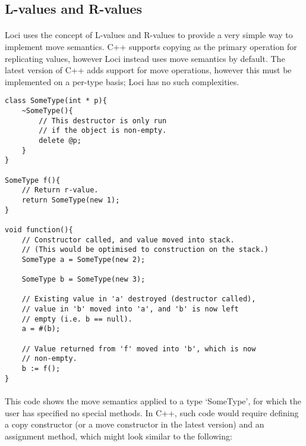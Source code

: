 \documentclass[12pt,twoside,notitlepage]{report}
\begin{document}
\subsection{L-values and R-values}

\paragraph{}
Loci uses the concept of L-values and R-values to provide a very simple way to implement move semantics. C++ supports copying as the primary operation for replicating values, however Loci instead uses move semantics by default. The latest version of C++ adds support for move operations, however this must be implemented on a per-type basis; Loci has no such complexities.

\small{
\begin{verbatim}
class SomeType(int * p){
    ~SomeType(){
        // This destructor is only run
        // if the object is non-empty.
        delete @p;
    }
}

SomeType f(){
    // Return r-value.
    return SomeType(new 1);
}

void function(){
    // Constructor called, and value moved into stack.
    // (This would be optimised to construction on the stack.)
    SomeType a = SomeType(new 2);
    
    SomeType b = SomeType(new 3);
    
    // Existing value in 'a' destroyed (destructor called),
    // value in 'b' moved into 'a', and 'b' is now left
    // empty (i.e. b == null).
    a = #(b);
    
    // Value returned from 'f' moved into 'b', which is now
    // non-empty.
    b := f();
}
\end{verbatim}
}

\paragraph{}
This code shows the move semantics applied to a type `SomeType', for which the user has specified no special methods. In C++, such code would require defining a copy constructor (or a move constructor in the latest version) and an assignment method, which might look similar to the following:
\end{document}

